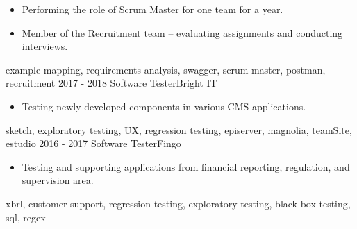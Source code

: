 \begin{experiences}
{\begin{itemize}
            \item Performing the role of Scrum Master for one team for a year.
            \item Member of the Recruitment team -- evaluating assignments and conducting interviews. 
        \end{itemize}
        } {\sc example mapping, \sc requirements analysis, \sc swagger, \sc scrum master, \sc postman, \sc recruitment}
\emptySeparator
\experience
    {2017 - 2018}   {Software Tester}{Bright IT}{}
    {} {
        \begin{itemize}
            \item Testing newly developed components in various CMS applications.
       \end{itemize}
        } {\sc sketch, \sc exploratory testing, \sc UX, \sc regression testing, \sc episerver, \sc magnolia, \sc teamSite, \sc estudio}
\emptySeparator
\experience
    {2016 - 2017}   {Software Tester}{Fingo}{}
    {} {
        \begin{itemize}
            \item Testing and supporting applications from financial reporting, regulation, and supervision area.
        \end{itemize}
        } {\sc xbrl, \sc customer support, \sc regression testing, \sc exploratory testing, \sc black-box testing, \sc sql, \sc regex}
\end{experiences}